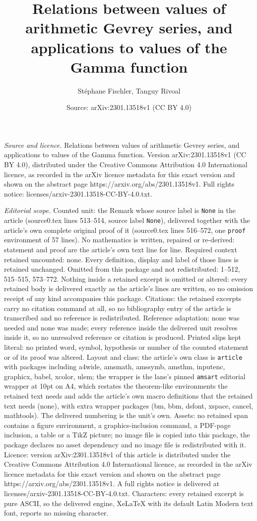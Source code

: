 \documentclass[10pt,a4paper]{amsart}
\title[Relations between values of arithmetic Gevrey series, and ap]{Relations between values of arithmetic Gevrey series, and applications to values of the Gamma function}
\author{St\'ephane Fischler, Tanguy Rivoal}
\date{Source: arXiv:2301.13518v1 (CC BY 4.0)}
\begin{document}
\maketitle

\noindent\emph{Source and licence.} Relations between values of arithmetic Gevrey series, and applications to values of the Gamma function. Version arXiv:2301.13518v1 (CC BY 4.0), distributed under the Creative Commons Attribution 4.0 International licence, as recorded in the arXiv licence metadata for this exact version and shown on the abstract page https://arxiv.org/abs/2301.13518v1. Full rights notice: licenses/arxiv-2301.13518-CC-BY-4.0.txt.\par\smallskip

\noindent\textit{Editorial scope.} Counted unit: the Remark whose source label is \texttt{None} in the article (source0.tex lines 513--514, source label \texttt{None}), delivered together with the article's own complete original proof of it (source0.tex lines 516--572, one \texttt{proof} environment of 57 lines). No mathematics is written, repaired or re-derived: statement and proof are the article's own text line for line. Required context retained uncounted: none. Every definition, display and label of those lines is retained unchanged. Omitted from this package and not redistributed: 1--512, 515--515, 573--772. Nothing inside a retained excerpt is omitted or altered: every retained body is delivered exactly as the article's lines are written, so no omission receipt of any kind accompanies this package. Citations: the retained excerpts carry no citation command at all, so no bibliography entry of the article is transcribed and no reference is redistributed. Reference adaptation: none was needed and none was made; every reference inside the delivered unit resolves inside it, so no unresolved reference or citation is produced. Printed slips kept literal: no printed word, symbol, hypothesis or number of the counted statement or of its proof was altered. Layout and class: the article's own class is \texttt{article} with packages including a4wide, amsmath, amssymb, amsthm, inputenc, graphicx, babel, xcolor, ulem; the wrapper is the lane's pinned \texttt{amsart} editorial wrapper at 10pt on A4, which restates the theorem-like environments the retained text needs and adds the article's own macro definitions that the retained text needs (none), with extra wrapper packages (bm, bbm, dsfont, xspace, cancel, mathtools). The delivered numbering is the unit's own. Assets: no retained span contains a figure environment, a graphics-inclusion command, a PDF-page inclusion, a table or a TikZ picture; no image file is copied into this package, the package declares no asset dependency and no image file is redistributed with it. Licence: version arXiv:2301.13518v1 of this article is distributed under the Creative Commons Attribution 4.0 International licence, as recorded in the arXiv licence metadata for this exact version and shown on the abstract page https://arxiv.org/abs/2301.13518v1. A full rights notice is delivered at licenses/arxiv-2301.13518-CC-BY-4.0.txt. Characters: every retained excerpt is pure ASCII, so the delivered engine, XeLaTeX with its default Latin Modern text font, reports no missing character.
\end{document}
